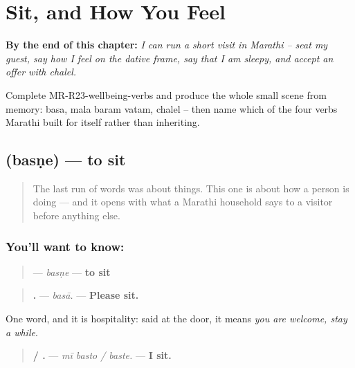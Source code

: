 
\chapter{Sit, and How You Feel}
\label{ch:mr-wellbeing-verbs}

\begin{chapteropening}
\textbf{By the end of this chapter:} \emph{I can run a short visit in Marathi -- seat my guest, say how I feel on the dative frame, say that I am sleepy, and accept an offer with chalel.}

Complete MR-R23-wellbeing-verbs and produce the whole small scene from memory: basa, mala baram vatam, chalel -- then name which of the four verbs Marathi built for itself rather than inheriting.
\end{chapteropening}

\section[basṇe]{ (basṇe) — to sit}

\label{lesson:MR-C23-basne}



\begin{quote}
The last run of words was about things. This one is about how a person is doing — and it opens with what a Marathi household says to a visitor before anything else.
\end{quote}

\subsection*{You'll want to know: }
\begin{quote}
\textbf{} — \emph{basṇe} — \textbf{to sit}
\end{quote}

\begin{quote}
\textbf{.} — \emph{basā.} — \textbf{Please sit.}
\end{quote}

One word, and it is hospitality: said at the door, it means \emph{you are welcome, stay a while}.

\begin{quote}
\textbf{  / .} — \emph{mī basto / baste.} — \textbf{I sit.}
\end{quote}

